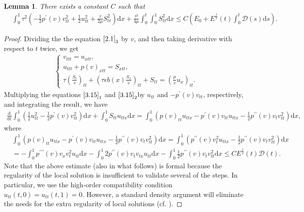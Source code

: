 \documentclass[10pt,reqno]{amsart}
\numberwithin{equation}{section}
\newtheorem{lemma}[theorem]{Lemma}
\newcommand{\dif}{\mathrm{d}}
\begin{document}
\begin{lemma} \label{Le3.7}
There exists a constant $C$ such that
\begin{align}
&\int_0^1 \tau^2(-\frac{1}{2} p^\prime(v)v_{tt}^2+\frac{1}{2}u_{tt}^2+\frac{\tau}{2\mu}S_{tt}^2 )\dif x +\frac{\tau^2}{4\mu}\int_0^t\int_0^1 S_{tt}^2 \dif x \le C\left(E_0+ E^\frac{1}{2}(t) \int_0^t \mathcal D(s)\dif s \right). \label{3.14}
\end{align}
\end{lemma}
\begin{proof}
Dividing the the equation $\eqref{2.1}_3$ by $v$, and then taking derivative with respect to $t$ twice, we get
\begin{align}\label{3.15}
\begin{cases}
v_{ttt}=u_{xtt},\\
u_{ttt}+p(v)_{xtt}=S_{xtt},\\
\tau \left(\frac{S_t}{v}\right)_{tt}+\left(\tau \epsilon b(x)\frac{S_x}{v} \right)_{tt}+S_{tt}=\left(\frac{\mu}{v} u_x\right)_{tt}.
\end{cases}
\end{align}
Multiplying the  equations  $\eqref{3.15}_1$ and $\eqref{3.15}_2$by $u_{tt}$ and $-p^\prime(v)v_{tt}$, respectively, and integrating the result, we have
\begin{align}\label{3.16}
\frac{\dif}{\dif t} \int_0^1 \left(\frac{1}{2} u_{tt}^2-\frac{1}{2} p^\prime(v)v_{tt}^2 \right)\dif x+\int_0^1 S_{tt} u_{ttx} \dif x
=\int_0^1 \left(p(v)_{tt} u_{ttx} -p^\prime(v) v_{tt} u_{ttx}-\frac{1}{2} p^{\prime\prime}(v) v_t v_{tt}^2\right) \dif x,
\end{align}
where
\begin{align*}
&\int_0^1 \left(p(v)_{tt} u_{ttx} -p^\prime(v) v_{tt} u_{ttx} -\frac{1}{2} p^{\prime\prime}(v) v_t v_{tt}^2\right)\dif x=\int_0^1 \left(p^{\prime\prime}(v) v_t^2 u_{ttx}-\frac{1}{2} p^{\prime\prime}(v) v_t v_{tt}^2\right) \dif x\\
&=-\int_0^1 p^{\prime\prime\prime}(v)v_xv_t^2 u_{tt} \dif x-\int_0^1 2p^{\prime\prime}(v) v_t v_{tx} u_{tt}\dif x -\int_0^1 \frac{1}{2} p^{\prime\prime}(v) v_t v_{tt}^2\dif x \le C E^\frac{1}{2}(t) \mathcal D(t).
\end{align*}
Note that the above estimate (also in what follows) is formal because the regularity of the local solution is insufficient to validate several of the steps. In particular, we use the high-order compatibility condition $u_{tt}(t,0)=u_{tt}(t,1)=0$. However, a standard density argument will eliminate the needs for the extra regularity of local solutions (cf. \cite{SCH86}).


\end{proof}
\end{document}
